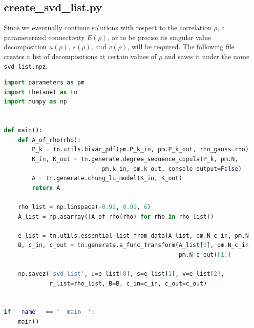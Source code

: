 \documentclass[bibliography=totoc, twoside]{article}
\numberwithin{equation}{section}
\begin{document}
\subsection*{create\_svd\_list.py}
Since we eventually continue solutions with respect to the correlation $\rho$, a parameterized connectivity $E(\rho)$, or to be precise its singular value decomposition $u(\rho)$, $s(\rho)$, and $v(\rho)$, will be required.
The following file creates a list of decompositions at certain values of $\rho$ and saves it under the name \texttt{svd\_list.npz}:
\begin{lstlisting}[language=python]
import parameters as pm
import thetanet as tn
import numpy as np


def main():
    def A_of_rho(rho):
        P_k = tn.utils.bivar_pdf(pm.P_k_in, pm.P_k_out, rho_gauss=rho)
        K_in, K_out = tn.generate.degree_sequence_copula(P_k, pm.N,
                            pm.k_in, pm.k_out, console_output=False)
        A = tn.generate.chung_lu_model(K_in, K_out)
        return A

    rho_list = np.linspace(-0.99, 0.99, 6)
    A_list = np.asarray([A_of_rho(rho) for rho in rho_list])

    e_list = tn.utils.essential_list_from_data(A_list, pm.N_c_in, pm.N_c_out)
    B, c_in, c_out = tn.generate.a_func_transform(A_list[0], pm.N_c_in,
                                                  pm.N_c_out)[1:]

    np.savez('svd_list', u=e_list[0], s=e_list[1], v=e_list[2],
             r_list=rho_list, B=B, c_in=c_in, c_out=c_out)


if __name__ == '__main__':
    main()
\end{lstlisting}
\end{document}
